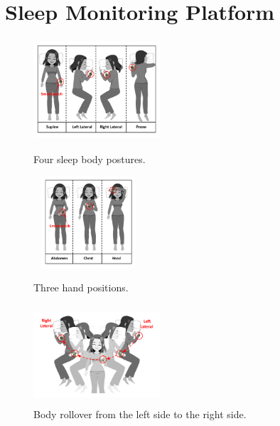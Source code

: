 \section{\systemname Sleep Monitoring Platform}\label{Sec:3design}





\begin{figure}
	\centering
	\begin{minipage}[t]{.33\textwidth}
		\centering
		  \includegraphics[width=4.7cm,height=3.7cm]{Figures/BodyPosture.pdf}
		\caption{Four sleep body postures.}
		\label{fig:BodyPosture}
	\end{minipage}%
	\begin{minipage}[t]{.33\textwidth}
		\centering
		\includegraphics[width=4.1cm,height=3.4cm]{Figures/HandPosition.pdf}
		\caption{Three hand positions.}
		\label{fig:HandPosition}		
	\end{minipage}
\begin{minipage}[t]{.33\textwidth}
		\centering
	\includegraphics[width=4.7cm,height=3.7cm]{Figures/BodyRollover.pdf}
	\caption{Body rollover from the left side to the right side.}
	\label{fig:BodyRollover}
\end{minipage}
\end{figure}




